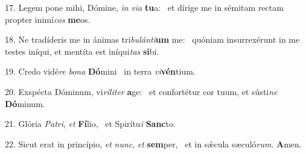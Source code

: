 17. Legem pone mihi, Dómine, \textit{in} \textit{vi}\textit{a} \textbf{tu}a: \ast\  et dírige me in sémitam rectam propter inimí\textit{cos} \textbf{me}os.\

18. Ne tradíderis me in ánimas tri\textit{bu}\textit{lán}\textit{ti}\textbf{um} me: \ast\  quóniam insurrexérunt in me testes iníqui, et mentíta est iníqui\textit{tas} \textbf{si}bi.\

19. Credo vidé\textit{re} \textit{bo}\textit{na} \textbf{Dó}mini \ast\  in terra \textit{vi}\textbf{vén}tium.\

20. Exspécta Dóminum, vi\textit{rí}\textit{li}\textit{ter} \textbf{a}ge: \ast\  et confortétur cor tuum, et sústi\textit{ne} \textbf{Dó}minum.\

21. Glória \textit{Pa}\textit{tri}, \textit{et} \textbf{Fí}lio, \ast\  et Spirítu\textit{i} \textbf{Sanc}to.\

22. Sicut erat in princípio, \textit{et} \textit{nunc}, \textit{et} \textbf{sem}per, \ast\  et in sǽcula sæculó\textit{rum}. \textbf{A}men.\

